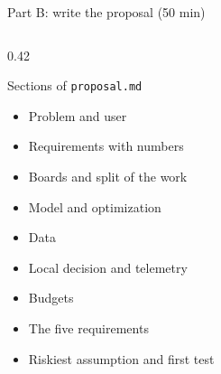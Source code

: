 \begin{frame}{Part B: write the proposal (50 min)}
  \begin{columns}[T]
    \begin{column}{0.42\textwidth}
      \begin{block}{Sections of \texttt{proposal.md}}
        \small
        \begin{itemize}
          \item Problem and user
          \item Requirements with numbers
          \item Boards and split of the work
          \item Model and optimization
          \item Data
          \item Local decision and telemetry
          \item Budgets
          \item The five requirements
          \item Riskiest assumption and first test
        \end{itemize}
      \end{block}
    \end{column}
  \end{columns}
\end{frame}


